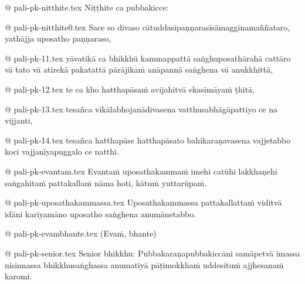@ pali-pk-nitthite.tex
Niṭṭhite ca pubbakicce:

@ pali-pk-nitthite0.tex
Sace so divaso cātuddasīpaṇṇarasīsāmaggīnamaññataro, yathājja uposatho paṇṇaraso,

@ pali-pk-11.tex
yāvatikā ca bhikkhū kammappattā saṅghuposathārahā cattāro vā tato vā atirekā pakatattā pārājikaṁ anāpannā saṅghena vā anukkhittā,

@ pali-pk-12.tex
te ca kho hatthapāsaṁ avijahitvā ekasīmāyaṁ ṭhitā,

@ pali-pk-13.tex
tesañca vikālabhojanādivasena vatthusabhāgāpattiyo ce na vijjanti,

@ pali-pk-14.tex
tesañca hatthapāse hatthapāsato bahikaraṇavasena vajjetabbo koci vajjanīyapuggalo ce natthi.

@ pali-pk-evantam.tex
Evantaṁ uposathakammaṁ imehi catūhi lakkhaṇehi saṅgahitaṁ pattakallaṁ nāma hoti, kātuṁ yuttarūpaṁ.

@ pali-pk-uposathakammassa.tex
Uposathakammassa pattakallattaṁ viditvā idāni kariyamāno uposatho saṅghena anumānetabbo.

@ pali-pk-evambhante.tex
(Evaṁ, bhante)

@ pali-pk-senior.tex
Senior bhikkhu: Pubbakaraṇapubbakiccāni samāpetvā imassa nisinnassa bhikkhusaṅghassa anumatiyā pāṭimokkhaṁ uddesituṁ ajjhesanaṁ karomi.
